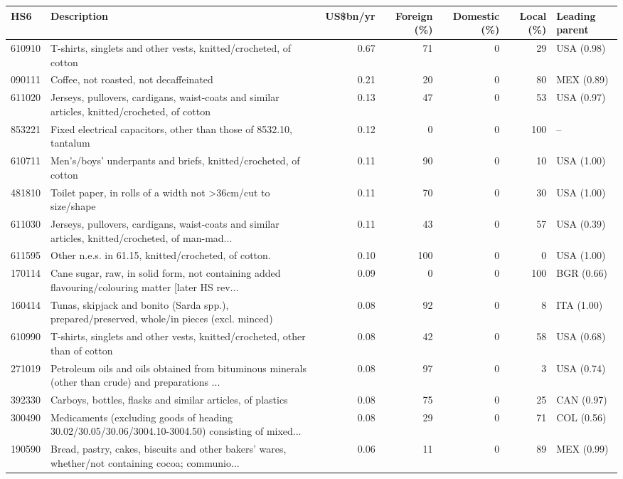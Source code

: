 \begin{tabular}{@{}l p{6.4cm} r r r r l@{}}
\toprule
HS6 & Description & US\$bn/yr & Foreign (\%) & Domestic (\%) & Local (\%) & Leading parent \\
\midrule
610910 & T-shirts, singlets and other vests, knitted/\allowbreak{}crocheted, of cotton & 0.67 & 71 & 0 & 29 & USA (0.98) \\
090111 & Coffee, not roasted, not decaffeinated & 0.21 & 20 & 0 & 80 & MEX (0.89) \\
611020 & Jerseys, pullovers, cardigans, waist-coats and similar articles, knitted/\allowbreak{}crocheted, of cotton & 0.13 & 47 & 0 & 53 & USA (0.97) \\
853221 & Fixed electrical capacitors, other than those of 8532.10, tantalum & 0.12 & 0 & 0 & 100 & -- \\
610711 & Men's/\allowbreak{}boys' underpants and briefs, knitted/\allowbreak{}crocheted, of cotton & 0.11 & 90 & 0 & 10 & USA (1.00) \\
481810 & Toilet paper, in rolls of a width not >36cm/\allowbreak{}cut to size/\allowbreak{}shape & 0.11 & 70 & 0 & 30 & USA (1.00) \\
611030 & Jerseys, pullovers, cardigans, waist-coats and similar articles, knitted/\allowbreak{}crocheted, of man-mad... & 0.11 & 43 & 0 & 57 & USA (0.39) \\
611595 & Other n.e.s. in 61.15, knitted/\allowbreak{}crocheted, of cotton. & 0.10 & 100 & 0 & 0 & USA (1.00) \\
170114 & Cane sugar, raw, in solid form, not containing added flavouring/\allowbreak{}colouring matter [later HS rev... & 0.09 & 0 & 0 & 100 & BGR (0.66) \\
160414 & Tunas, skipjack and bonito (Sarda spp.), prepared/\allowbreak{}preserved, whole/\allowbreak{}in pieces (excl. minced) & 0.08 & 92 & 0 & 8 & ITA (1.00) \\
610990 & T-shirts, singlets and other vests, knitted/\allowbreak{}crocheted, other than of cotton & 0.08 & 42 & 0 & 58 & USA (0.68) \\
271019 & Petroleum oils and oils obtained from bituminous minerals (other than crude) and preparations ... & 0.08 & 97 & 0 & 3 & USA (0.74) \\
392330 & Carboys, bottles, flasks and similar articles, of plastics & 0.08 & 75 & 0 & 25 & CAN (0.97) \\
300490 & Medicaments (excluding goods of heading 30.02/\allowbreak{}30.05/\allowbreak{}30.06/\allowbreak{}3004.10-3004.50) consisting of mixed... & 0.08 & 29 & 0 & 71 & COL (0.56) \\
190590 & Bread, pastry, cakes, biscuits and other bakers' wares, whether/\allowbreak{}not containing cocoa; communio... & 0.06 & 11 & 0 & 89 & MEX (0.99) \\
\bottomrule
\end{tabular}
